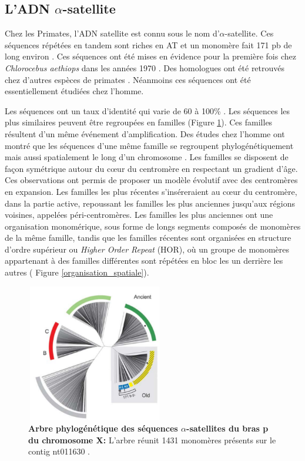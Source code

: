 \documentclass[12pt,a4paper]{article}
\begin{document}
\subsection{L'ADN $\alpha$-satellite}
Chez les Primates, l'ADN satellite  est connu sous le nom d'$\alpha$-satellite. Ces séquences répétées en tandem sont riches en AT et un monomère fait 171 pb de long environ \cite{Willard1991}. Ces séquences ont été mises en évidence pour la première fois chez \textit{Chlorocebus aethiops} dans les années 1970 \cite{Kurnit1974}. Des homologues ont été retrouvés chez d’autres espèces de primates \cite{Lee1997}. Néanmoins ces séquences ont été essentiellement étudiées chez l’homme.

Les séquences ont un taux d’identité qui varie de  60 à 100\% \cite{Alexandrov2001}. Les séquences les plus similaires peuvent être regroupées en familles (Figure \ref{shepelev}). Ces familles résultent d'un même événement d'amplification. Des études chez l'homme ont montré que les séquences d'une même famille se regroupent phylogénétiquement mais aussi spatialement le long d'un chromosome \cite{Shepelev2009}. Les familles se disposent de façon symétrique autour du cœur du centromère en respectant un gradient d'âge.  Ces observations ont permis de proposer un modèle évolutif avec des centromères en expansion. Les familles les plus récentes s’inséreraient au cœur du centromère, dans la partie active, repoussant les familles les plus anciennes jusqu'aux régions voisines, appelées péri-centromères. Les familles les plus anciennes ont une organisation monomérique, sous forme de longs segments composés de monomères de la même famille, tandis que les familles récentes sont organisées en structure d'ordre supérieur ou \textit{Higher Order Repeat} (HOR), où un groupe de monomères appartenant à des familles différentes sont répétées en bloc les un derrière les autres ( Figure \ref{organisation_spatiale}).

\begin{figure}
	\center
		\includegraphics[height=6cm, width=6cm]{img/shepelev.png}
		\caption{\textbf{Arbre phylogénétique des séquences $\alpha$-satellites du bras p du chromosome X:} L’arbre réunit 1431 monomères présents sur le contig nt011630 \cite{Shepelev2009}.\label{shepelev}}
\end{figure}
\end{document}
